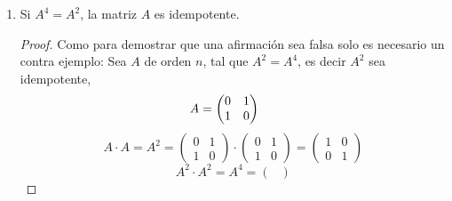 \begin{enumerate}[label=\listAlph]
\begin{proof}
\[                    \sim
                    \begin{aligned}
                        \frac{1}{3}F_3 &\mapsto F_3 \\
                        F_2 - F_3 &\mapsto F_2 \\
                    \end{aligned}
                    \begin{pmatrix}
                        1 & -2 \\
                        0 & 0
                    \end{pmatrix}
                \]
            \end{proof}
        
        \item Si \(A^4 = A^2\), la matriz \(A\) es idempotente. \\
            \begin{proof}
                Como para demostrar que una afirmación sea falsa solo es necesario un contra ejemplo:
                Sea \(A\) de orden \(n\), tal que \(A^2 = A^4\), es decir \(A^2\) sea idempotente, 
                \[
                    A = 
                    \begin{pmatrix}
                        0 & 1 \\
                        1 & 0
                    \end{pmatrix}
                    \hspace{0.5cm}
                \]
                \[
                    A \cdot A =
                    A^2 = 
                    \begin{pmatrix}
                        0 & 1 \\
                        1 & 0
                    \end{pmatrix}
                    \cdot
                    \begin{pmatrix}
                        0 & 1 \\
                        1 & 0
                    \end{pmatrix}
                    =
                    \begin{pmatrix}
                        1 & 0 \\
                        0 & 1
                    \end{pmatrix}
                \]
                \[
                    A^2 \cdot A^2 =
                    A^4 = 
                    \begin{pmatrix}

\end{pmatrix}\]
\end{proof}
\end{enumerate}
